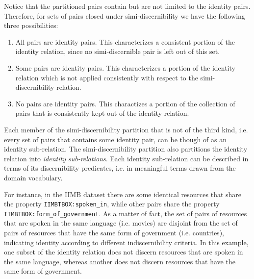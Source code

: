 Notice that the partitioned pairs contain but are not limited to
  the identity pairs.
Therefore, for sets of pairs closed under simi-discernibility
  we have the following three possibilities:
  \begin{enumerate}
    \item All pairs are identity pairs.
          This characterizes a consistent portion of the identity relation,
          since no simi-discernible pair is left out of this set.
    \item Some pairs are identity pairs.
          This characterizes a portion of the identity relation which is not
          applied consistently with respect to
          the simi-discernibility relation.
    \item No pairs are identity pairs.
          This charactizes a portion of the collection of pairs
          that is consistently kept out of the identity relation.
  \end{enumerate}

\noindent Each member of the simi-discernibility partition that is not
  of the third kind, i.e. every set of pairs that contains some identity pair,
  can be though of as an identity sub-relation.
The simi-discernibility partition also partitions the identity relation
  into \emph{identity sub-relations}.
Each identity sub-relation can be described in terms of
  its discernibility predicates,
  i.e. in meaningful terms drawn from the domain vocabulary.

For instance, in the IIMB dataset there are some identical resources that
  share the property {\small \texttt{IIMBTBOX:spoken\_in}},
  while other pairs share the property
  {\small \texttt{IIMBTBOX:form\_of\_government}}.
As a matter of fact, the set of pairs of resources that are spoken in
  the same language (i.e. movies) are disjoint from
  the set of pairs of resources that have the same form of government
  (i.e. countries), indicating identity according to
  different indiscernibility criteria.
In this example, one subset of the identity relation does not discern
  resources that are spoken in the same language,
  whereas another does not discern resources that have
  the same form of government.



